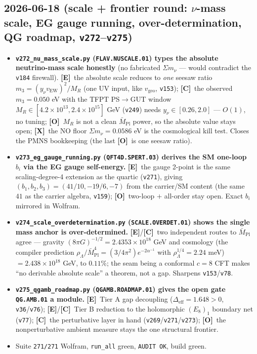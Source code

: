 \documentclass[11pt]{article}
\providecommand{\mE}{\textbf{[E]}}\providecommand{\mC}{\textbf{[C]}}
\providecommand{\mO}{\textbf{[O]}}\providecommand{\mX}{\textbf{[X]}}
\providecommand{\vref}[1]{\texttt{#1}}
\providecommand{\Mbar}{\bar M_{\mathrm{Pl}}}\providecommand{\Z}{\mathbb{Z}}\providecommand{\PP}{\mathbb{P}}
\begin{document}
\subsection*{2026-06-18 (scale + frontier round: $\nu$-mass scale, EG gauge running, over-determination, QG roadmap, \texttt{v272}--\texttt{v275})}
\begin{itemize}
\item \textbf{\texttt{v272\_nu\_mass\_scale.py} (\texttt{FLAV.NUSCALE.01}) types the absolute neutrino-mass scale
  honestly} (no fabricated $\Sigma m_\nu$ --- would contradict the \vref{v184} firewall). \mE\ the absolute
  scale reduces to \emph{one} seesaw ratio $m_3=(y_\nu v_{\mathrm{EW}})^2/M_R$ (one UV input, like $v_{\mathrm{geo}}$,
  \vref{v153}); \mC\ the observed $m_3{=}0.050$ eV with the TFPT PS$\to$GUT window $M_R\in[4.2{\times}10^{13},
  2.4{\times}10^{15}]$ GeV (\vref{v249}) needs $y_\nu\in[0.26,2.0]$ --- $O(1)$, no tuning; \mO\ $M_R$ is not a clean
  $\Mbar$ power, so the absolute value stays open; \mX\ the NO floor $\Sigma m_\nu{=}0.0586$ eV is the cosmological
  kill test. Closes the PMNS bookkeeping (the last \mO\ is one seesaw ratio).
\item \textbf{\texttt{v273\_eg\_gauge\_running.py} (\texttt{QFT4D.SPERT.03}) derives the SM one-loop $b_i$ via the EG
  gauge self-energy.} \mE\ the gauge 2-point is the same scaling-degree-4 extension as the quartic (\vref{v271}),
  giving $(b_1,b_2,b_3)=(41/10,-19/6,-7)$ from the carrier/SM content (the same $41$ as the carrier algebra,
  \vref{v159}); \mO\ two-loop $+$ all-order stay open. Exact $b_i$ mirrored in Wolfram.
\item \textbf{\texttt{v274\_scale\_overdetermination.py} (\texttt{SCALE.OVERDET.01}) shows the single mass anchor is
  over-determined.} \mE/\mC\ two independent routes to $\Mbar$ agree --- gravity $(8\pi G)^{-1/2}=2.4353{\times}10^{18}$
  GeV and cosmology (the compiler prediction $\rho_\Lambda/\Mbar^4=(3/4\pi^2)e^{-2\alpha^{-1}}$ with
  $\rho_\Lambda^{1/4}=2.24$ meV) $=2.438{\times}10^{18}$ GeV, to $0.11\%$; the seam being a conformal $c{=}8$ CFT
  makes ``no derivable absolute scale'' a theorem, not a gap. Sharpens \vref{v153}/\vref{v78}.
\item \textbf{\texttt{v275\_qgamb\_roadmap.py} (\texttt{QGAMB.ROADMAP.01}) gives the open gate \texttt{QG.AMB.01} a
  module.} \mE\ Tier A gap decoupling ($\Delta_{\mathrm{eff}}=1.648>0$, \vref{v36}/\vref{v76}); \mE/\mC\ Tier B
  reduction to the holomorphic $(E_8)_1$ boundary net (\vref{v77}); \mC\ the perturbative layer in hand
  (\vref{v269}/\vref{v271}/\vref{v273}); \mO\ the nonperturbative ambient measure stays the one structural frontier.
\item Suite \texttt{271/271} Wolfram, \texttt{run\_all} green, \texttt{AUDIT OK}, build green.
\end{itemize}
\end{document}
